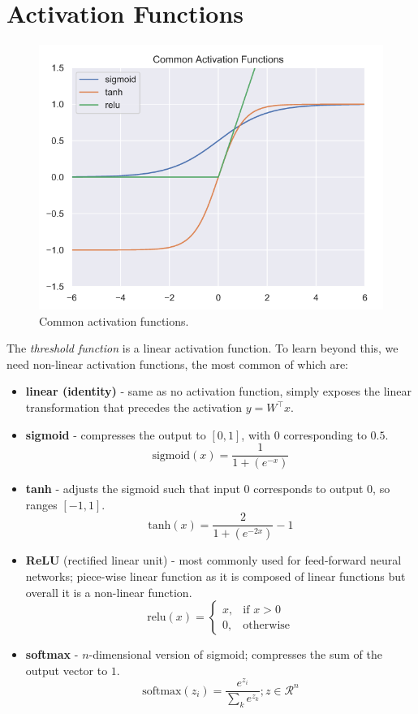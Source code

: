 \documentclass[11pt]{article}
\begin{document}
\section{Activation Functions}
\begin{figure}[htb!]
  \centering
  \caption{Common activation functions.}
  \includegraphics[scale=0.4]{caf}
\end{figure}
The \textit{threshold function} is a linear activation function.
To learn beyond this, we need non-linear activation functions, the most common of which are:
\begin{itemize}
  \item \textbf{linear (identity)} - same as no activation function, simply exposes the linear transformation that precedes the activation $y = W^\intercal x$.
  \item \textbf{sigmoid} - compresses the output to $[0, 1]$, with $0$ corresponding to $0.5$.
    \[
      \text{sigmoid}(x) = \frac{1}{1 + (e^{-x})} 
    \]
  \item \textbf{tanh} - adjusts the sigmoid such that input $0$ corresponds to output $0$, so ranges $[-1, 1]$.
    \[
      \text{tanh}(x) = \frac{2}{1 + (e^{-2x})} - 1 
    \]
  \item \textbf{ReLU} (rectified linear unit) - most commonly used for feed-forward neural networks; piece-wise linear function as it is composed of linear functions but overall it is a non-linear function.
    \[
      \text{relu}(x) =
      \begin{cases}
        x, & \text{if } x > 0 \\
        0, & \text{otherwise}
      \end{cases}
    \]
  \item \textbf{softmax} - $n$-dimensional version of sigmoid; compresses the sum of the output vector to $1$.
    \[
      \text{softmax}(z_i) = \frac{e^{z_i}}{\sum_k e^{z_k}}; z \in \mathcal{R}^n 
    \]
\end{itemize}
\end{document}
